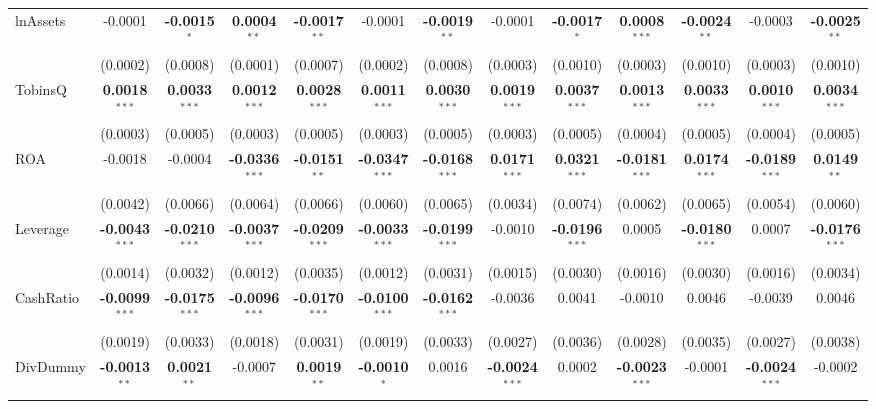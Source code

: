 \documentclass[11pt,a4paper]{article}
\begin{document}
\begin{table}[htbp]
\begin{tabular}{lcccccccccccc}
\midrule
lnAssets & -0.0001 & \textbf{-0.0015}$^{*}$ & \textbf{0.0004}$^{**}$ & \textbf{-0.0017}$^{**}$ & -0.0001 & \textbf{-0.0019}$^{**}$ & -0.0001 & \textbf{-0.0017}$^{*}$ & \textbf{0.0008}$^{***}$ & \textbf{-0.0024}$^{**}$ & -0.0003 & \textbf{-0.0025}$^{**}$ \\
 & (0.0002) & (0.0008) & (0.0001) & (0.0007) & (0.0002) & (0.0008) & (0.0003) & (0.0010) & (0.0003) & (0.0010) & (0.0003) & (0.0010) \\
TobinsQ & \textbf{0.0018}$^{***}$ & \textbf{0.0033}$^{***}$ & \textbf{0.0012}$^{***}$ & \textbf{0.0028}$^{***}$ & \textbf{0.0011}$^{***}$ & \textbf{0.0030}$^{***}$ & \textbf{0.0019}$^{***}$ & \textbf{0.0037}$^{***}$ & \textbf{0.0013}$^{***}$ & \textbf{0.0033}$^{***}$ & \textbf{0.0010}$^{***}$ & \textbf{0.0034}$^{***}$ \\
 & (0.0003) & (0.0005) & (0.0003) & (0.0005) & (0.0003) & (0.0005) & (0.0003) & (0.0005) & (0.0004) & (0.0005) & (0.0004) & (0.0005) \\
ROA & -0.0018 & -0.0004 & \textbf{-0.0336}$^{***}$ & \textbf{-0.0151}$^{**}$ & \textbf{-0.0347}$^{***}$ & \textbf{-0.0168}$^{***}$ & \textbf{0.0171}$^{***}$ & \textbf{0.0321}$^{***}$ & \textbf{-0.0181}$^{***}$ & \textbf{0.0174}$^{***}$ & \textbf{-0.0189}$^{***}$ & \textbf{0.0149}$^{**}$ \\
 & (0.0042) & (0.0066) & (0.0064) & (0.0066) & (0.0060) & (0.0065) & (0.0034) & (0.0074) & (0.0062) & (0.0065) & (0.0054) & (0.0060) \\
Leverage & \textbf{-0.0043}$^{***}$ & \textbf{-0.0210}$^{***}$ & \textbf{-0.0037}$^{***}$ & \textbf{-0.0209}$^{***}$ & \textbf{-0.0033}$^{***}$ & \textbf{-0.0199}$^{***}$ & -0.0010 & \textbf{-0.0196}$^{***}$ & 0.0005 & \textbf{-0.0180}$^{***}$ & 0.0007 & \textbf{-0.0176}$^{***}$ \\
 & (0.0014) & (0.0032) & (0.0012) & (0.0035) & (0.0012) & (0.0031) & (0.0015) & (0.0030) & (0.0016) & (0.0030) & (0.0016) & (0.0034) \\
CashRatio & \textbf{-0.0099}$^{***}$ & \textbf{-0.0175}$^{***}$ & \textbf{-0.0096}$^{***}$ & \textbf{-0.0170}$^{***}$ & \textbf{-0.0100}$^{***}$ & \textbf{-0.0162}$^{***}$ & -0.0036 & 0.0041 & -0.0010 & 0.0046 & -0.0039 & 0.0046 \\
 & (0.0019) & (0.0033) & (0.0018) & (0.0031) & (0.0019) & (0.0033) & (0.0027) & (0.0036) & (0.0028) & (0.0035) & (0.0027) & (0.0038) \\
DivDummy & \textbf{-0.0013}$^{**}$ & \textbf{0.0021}$^{**}$ & -0.0007 & \textbf{0.0019}$^{**}$ & \textbf{-0.0010}$^{*}$ & 0.0016 & \textbf{-0.0024}$^{***}$ & 0.0002 & \textbf{-0.0023}$^{***}$ & -0.0001 & \textbf{-0.0024}$^{***}$ & -0.0002 \\

\end{tabular}
\end{table}
\end{document}
